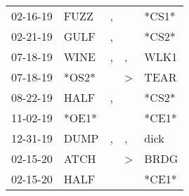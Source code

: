 \begin{supertabular}{p{0.07\textwidth}p{0.06\textwidth}p{0.02\textwidth}p{0.02\textwidth}p{0.06\textwidth}}
          02-16-19\textsuperscript{} &           FUZZ\textsuperscript{} &                , &                  &                            *CS1* \\
          02-21-19\textsuperscript{} &           GULF\textsuperscript{} &                , &                  &                            *CS2* \\
          07-18-19\textsuperscript{} &           WINE\textsuperscript{} &                , &                , &           WLK1\textsuperscript{} \\
          07-18-19\textsuperscript{} &                            *OS2* &                  &     \textgreater &           TEAR\textsuperscript{} \\
          08-22-19\textsuperscript{} &           HALF\textsuperscript{} &                , &                  &                            *CS2* \\
          11-02-19\textsuperscript{} &                            *OE1* &                  &                  &                            *CE1* \\
          12-31-19\textsuperscript{} &           DUMP\textsuperscript{} &                , &                , &           dick\textsuperscript{} \\
          02-15-20\textsuperscript{} &           ATCH\textsuperscript{} &                  &     \textgreater &           BRDG\textsuperscript{} \\
          02-15-20\textsuperscript{} &           HALF\textsuperscript{} &                  &                  &                            *CE1* \\
\end{supertabular}

